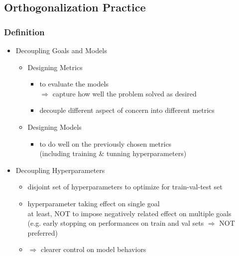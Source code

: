 \subsection{Orthogonalization Practice}
\subsubsection{Definition}
\begin{itemize}
\item Decoupling Goals and Models
	\begin{itemize}
	\item Designing Metrics
		\begin{itemize}
		\item to evaluate the models \\ 
		$\Rightarrow$ capture how well the problem solved as desired
		\item decouple different aspect of concern into different metrics
		\end{itemize}
	\item Designing Models
		\begin{itemize}
		\item to do well on the previously chosen metrics \\
		(including training \& tunning hyperparameters)
		\end{itemize}
	\end{itemize}
\item Decoupling Hyperparameters
	\begin{itemize}
	\item disjoint set of hyperparameters to optimize for train-val-test set
	\item hyperparameter taking effect on single goal \\
	at least, NOT to impose negatively related effect on multiple goals \\
	(e.g. early stopping on performances on train and val sets $\Rightarrow$ NOT preferred)
	\item $\Rightarrow$ clearer control on model behaviors
	\end{itemize}
\end{itemize}


